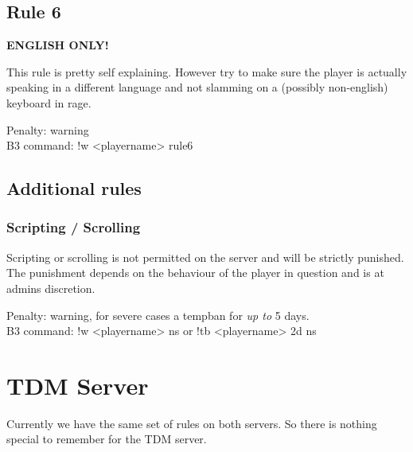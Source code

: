 \subsection*{Rule 6}
\label{rules:sd:6}
\textbf{ENGLISH ONLY!}

This rule is pretty self explaining. However try to make sure the player is actually speaking in a different language and not slamming on a (possibly non-english) keyboard in rage.

\begin{addmargin}[2em]{4em}
Penalty: warning \\
B3 command: !w <playername> rule6
\end{addmargin}

\subsection*{Additional rules}
\subsubsection*{Scripting / Scrolling}
Scripting or scrolling is not permitted on the server and will be strictly punished. The punishment depends on the behaviour of the player in question and is at admins discretion.

\begin{addmargin}[2em]{4em}
Penalty: warning, for severe cases a tempban for \textit{up to} 5 days.\\
B3 command: !w <playername> ns or !tb <playername> 2d ns
\end{addmargin}


\section{TDM Server}
Currently we have the same set of rules on both servers. So there is nothing special to remember for the TDM server.
